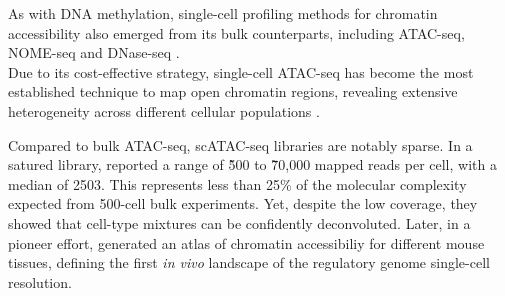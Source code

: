 
As with DNA methylation, single-cell profiling methods for chromatin accessibility also emerged from its bulk counterparts, including ATAC-seq\cite{Buenrostro2015a}, NOME-seq \cite{Pott2016} and DNase-seq \cite{Jin2015}.
\\

Due to its cost-effective strategy, single-cell ATAC-seq has become the most established technique to map open chromatin regions, revealing extensive heterogeneity across different cellular populations \cite{Cusanovich2015,Cao2018,Chen2018}. 

Compared to bulk ATAC-seq, scATAC-seq libraries are notably sparse. In a satured library, \cite{Cusanovich2015} reported a range of \~ 500 to \~ 70,000 mapped reads per cell, with a median of 2503. This represents less than 25\% of the molecular complexity expected from 500-cell bulk experiments. Yet, despite the low coverage, they showed that cell-type mixtures can be confidently deconvoluted. Later, in a pioneer effort, \cite{Cusanovich2018b} generated an atlas of chromatin accessibiliy for different mouse tissues, defining the first \textit{in vivo} landscape of the regulatory genome single-cell resolution.\\

